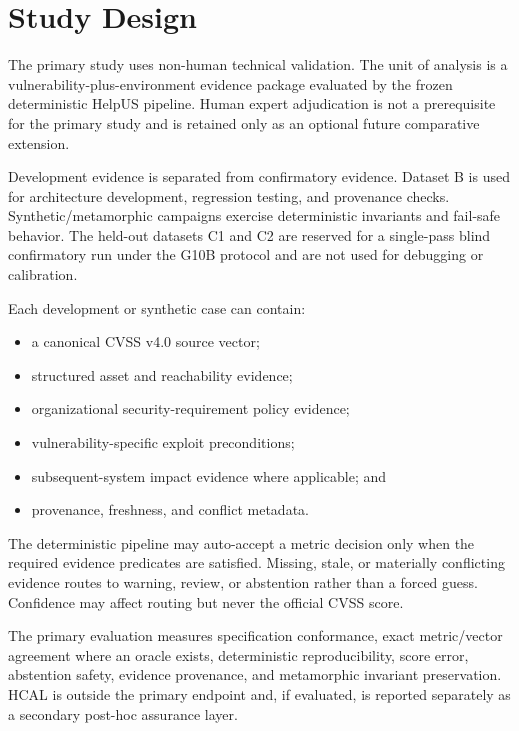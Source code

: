 \section{Study Design}
\label{sec:case-study}

The primary study uses non-human technical validation. The unit of analysis is
a vulnerability-plus-environment evidence package evaluated by the frozen
deterministic HelpUS pipeline. Human expert adjudication is not a prerequisite
for the primary study and is retained only as an optional future comparative
extension.

Development evidence is separated from confirmatory evidence. Dataset B is
used for architecture development, regression testing, and provenance checks.
Synthetic/metamorphic campaigns exercise deterministic invariants and
fail-safe behavior. The held-out datasets C1 and C2 are reserved for a
single-pass blind confirmatory run under the G10B protocol and are not used for
debugging or calibration.

Each development or synthetic case can contain:
\begin{itemize}[leftmargin=*]
  \item a canonical CVSS v4.0 source vector;
  \item structured asset and reachability evidence;
  \item organizational security-requirement policy evidence;
  \item vulnerability-specific exploit preconditions;
  \item subsequent-system impact evidence where applicable; and
  \item provenance, freshness, and conflict metadata.
\end{itemize}

The deterministic pipeline may auto-accept a metric decision only when the
required evidence predicates are satisfied. Missing, stale, or materially
conflicting evidence routes to warning, review, or abstention rather than a
forced guess. Confidence may affect routing but never the official CVSS score.

The primary evaluation measures specification conformance, exact
metric/vector agreement where an oracle exists, deterministic reproducibility,
score error, abstention safety, evidence provenance, and metamorphic invariant
preservation. HCAL is outside the primary endpoint and, if evaluated, is
reported separately as a secondary post-hoc assurance layer.
